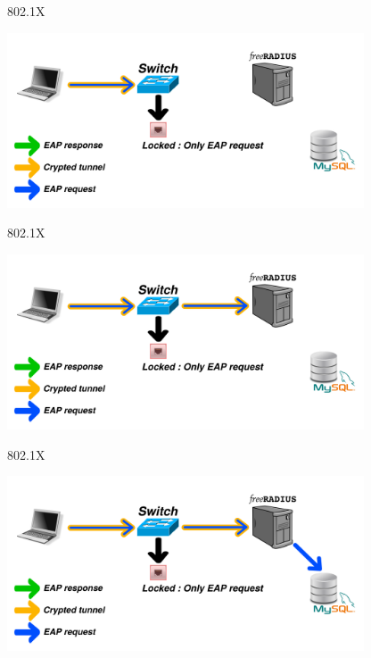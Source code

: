 \documentclass[12pt]{beamer}
\begin{document}
\begin{frame}[noframenumbering]{802.1X}
\vfill
\begin{center}
    \includegraphics[width=300pt]{img/dot1x_2.pdf}
\end{center}
\vfill
\end{frame}

\begin{frame}[noframenumbering]{802.1X}
\vfill
\begin{center}
    \includegraphics[width=300pt]{img/dot1x_3.pdf}
\end{center}
\vfill
\end{frame}

\begin{frame}[noframenumbering]{802.1X}
\vfill
\begin{center}
    \includegraphics[width=300pt]{img/dot1x_4.pdf}
\end{center}
\vfill
\end{frame}
\end{document}
